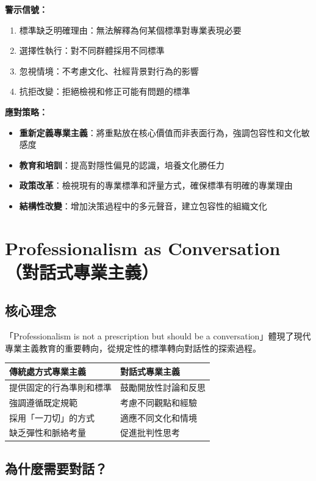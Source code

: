 \documentclass[12pt,a4paper]{article}
\begin{document}
\textbf{警示信號：}
\begin{enumerate}
    \item 標準缺乏明確理由：無法解釋為何某個標準對專業表現必要
    \item 選擇性執行：對不同群體採用不同標準
    \item 忽視情境：不考慮文化、社經背景對行為的影響
    \item 抗拒改變：拒絕檢視和修正可能有問題的標準
\end{enumerate}

\textbf{應對策略：}
\begin{itemize}[nosep]
    \item \textbf{重新定義專業主義}：將重點放在核心價值而非表面行為，強調包容性和文化敏感度
    \item \textbf{教育和培訓}：提高對隱性偏見的認識，培養文化勝任力
    \item \textbf{政策改革}：檢視現有的專業標準和評量方式，確保標準有明確的專業理由
    \item \textbf{結構性改變}：增加決策過程中的多元聲音，建立包容性的組織文化
\end{itemize}

\section{Professionalism as Conversation（對話式專業主義）}

\subsection{核心理念}

「Professionalism is not a prescription but should be a conversation」體現了現代專業主義教育的重要轉向，從規定性的標準轉向對話性的探索過程。

\begin{longtable}{p{6cm}p{7.5cm}}
\toprule
\textbf{傳統處方式專業主義} & \textbf{對話式專業主義} \\
\midrule
\endhead
提供固定的行為準則和標準 & 鼓勵開放性討論和反思 \\
強調遵循既定規範 & 考慮不同觀點和經驗 \\
採用「一刀切」的方式 & 適應不同文化和情境 \\
缺乏彈性和脈絡考量 & 促進批判性思考 \\
\bottomrule
\end{longtable}

\subsection{為什麼需要對話？}
\end{document}
